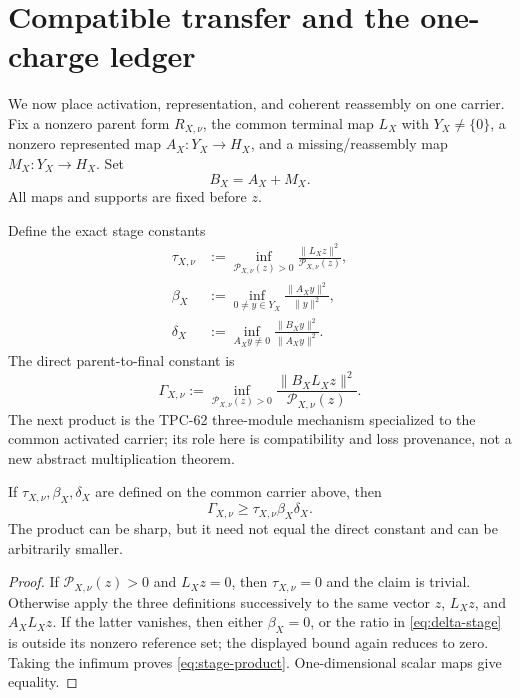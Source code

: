 \section{Compatible transfer and the one-charge ledger}

We now place activation, representation, and coherent reassembly on one
carrier. Fix a nonzero parent form \(R_{X,\nu}\), the common terminal map
\(L_X\) with \(Y_X\ne\{0\}\), a nonzero
represented map \(A_X:Y_X\to H_X\), and a missing/reassembly map
\(M_X:Y_X\to H_X\). Set
\[
 B_X=A_X+M_X.
\]
All maps and supports are fixed before \(z\).

Define the exact stage constants
\begin{align}
 \tau_{X,\nu}
 &:=\inf_{\mathcal P_{X,\nu}(z)>0}
       \frac{\|L_Xz\|^2}{\mathcal P_{X,\nu}(z)},
 \label{eq:tau-stage}\\
 \beta_X
 &:=\inf_{0\ne y\in Y_X}\frac{\|A_Xy\|^2}{\|y\|^2},
 \label{eq:beta-stage}\\
 \delta_X
 &:=\inf_{A_Xy\ne0}
       \frac{\|B_Xy\|^2}{\|A_Xy\|^2}.
 \label{eq:delta-stage}
\end{align}
The direct parent-to-final constant is
\begin{equation}\label{eq:direct-gamma}
 \Gamma_{X,\nu}
 :=\inf_{\mathcal P_{X,\nu}(z)>0}
 \frac{\|B_XL_Xz\|^2}{\mathcal P_{X,\nu}(z)}.
\end{equation}
The next product is the TPC-62 three-module mechanism specialized to the
common activated carrier; its role here is compatibility and loss provenance,
not a new abstract multiplication theorem.

\begin{theorem}\label{thm:three-stage}
If \(\tau_{X,\nu},\beta_X,\delta_X\) are defined on the common carrier above,
then
\begin{equation}\label{eq:stage-product}
 \boxed{\quad
 \Gamma_{X,\nu}\ge\tau_{X,\nu}\beta_X\delta_X.
 \quad}
\end{equation}
The product can be sharp, but it need not equal the direct constant and can be
arbitrarily smaller.
\end{theorem}

\begin{proof}
If \(\mathcal P_{X,\nu}(z)>0\) and \(L_Xz=0\), then
\(\tau_{X,\nu}=0\) and the claim is trivial. Otherwise apply the three
definitions successively to the same vector \(z\), \(L_Xz\), and \(A_XL_Xz\).
If the latter vanishes, then either \(\beta_X=0\), or the ratio in
\eqref{eq:delta-stage} is outside its nonzero reference set; the displayed
bound again reduces to zero. Taking the infimum proves
\eqref{eq:stage-product}. One-dimensional scalar maps give equality.
\end{proof}

